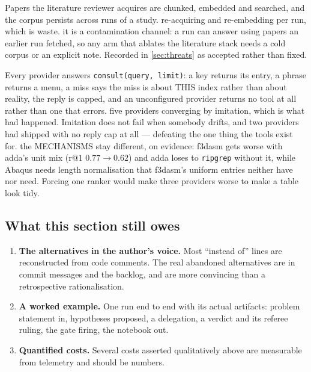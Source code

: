 {Papers the literature reviewer acquires are chunked, embedded and searched, and
the corpus persists across runs of a study.}
{re-acquiring and re-embedding per run, which is waste.}
{it is a contamination channel: a run can answer using papers an earlier run
fetched, so any arm that ablates the literature stack needs a cold corpus or an
explicit note. Recorded in \cref{sec:threats} as accepted rather than fixed.}

{Every provider answers \texttt{consult(query, limit)}: a key returns its
entry, a phrase returns a menu, a miss says the miss is about THIS index rather
than about reality, the reply is capped, and an unconfigured provider returns no
tool at all rather than one that errors.}
{five providers converging by imitation, which is what had happened. Imitation
does not fail when somebody drifts, and two providers had shipped with no reply
cap at all --- defeating the one thing the tools exist for.}
{the MECHANISMS stay different, on evidence: f3dasm gets worse with adda's unit
mix ($\mathrm{r@}1$ $0.77 \to 0.62$) and adda loses to \texttt{ripgrep}
without it, while Abaqus needs length normalisation that f3dasm's uniform
entries neither have nor need. Forcing one ranker would make three providers
worse to make a table look tidy.}

\subsection{What this section still owes}

\begin{enumerate}
  \item \textbf{The alternatives in the author's voice.} Most ``instead of''
    lines are reconstructed from code comments. The real abandoned
    alternatives are in commit messages and the backlog, and are more
    convincing than a retrospective rationalisation.
  \item \textbf{A worked example.} One run end to end with its actual
    artifacts: problem statement in, hypotheses proposed, a delegation, a
    verdict and its referee ruling, the gate firing, the notebook out.
  \item \textbf{Quantified costs.} Several costs asserted qualitatively above
    are measurable from telemetry and should be numbers.
\end{enumerate}
